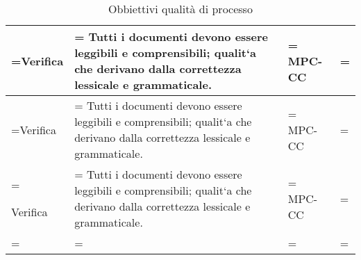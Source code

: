\begin{xltabular}{\textwidth} {
        >{\hsize\linewidth=\hsize}X
        >{\hsize\linewidth=\hsize}X
        >{\hsize\linewidth=\hsize}X
        >{\hsize\linewidth=\hsize}X
    }
    Verifica &
    Tutti i documenti devono essere leggibili e
    comprensibili; qualit`a che derivano dalla correttezza
    lessicale e grammaticale. &
    MPC-CC
    \\ \hline

    Verifica &
    Tutti i documenti devono essere leggibili e
    comprensibili; qualit`a che derivano dalla correttezza
    lessicale e grammaticale. &
    MPC-CC
    \\ \hline

    Verifica &
    Tutti i documenti devono essere leggibili e
    comprensibili; qualit`a che derivano dalla correttezza
    lessicale e grammaticale. &
    MPC-CC
    \\ \hline

    \caption{Obbiettivi qualità di processo}
\end{xltabular}